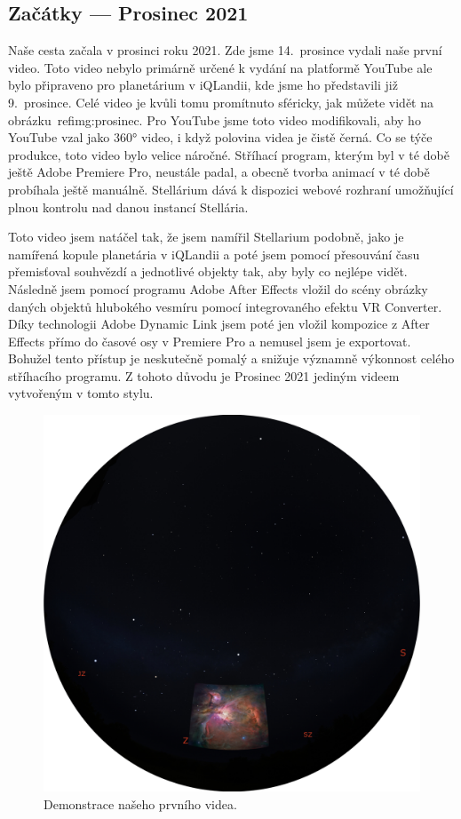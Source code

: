\documentclass[12pt,a4paper,titlepage]{article}
\begin{document}
\subsection{Začátky --- Prosinec 2021}
Naše cesta začala v prosinci roku 2021. Zde jsme 14.\ prosince vydali naše první video. Toto video nebylo primárně určené k vydání na platformě YouTube ale bylo připraveno pro planetárium v iQLandii, kde jsme ho představili již 9.\ prosince. Celé video je kvůli tomu promítnuto sféricky, jak můžete vidět na obrázku~ref{img:prosinec}. Pro YouTube jsme toto video modifikovali, aby ho YouTube vzal jako 360° video, i když polovina videa je čistě černá. Co se týče produkce, toto video bylo velice náročné. Stříhací program, kterým byl v té době ještě Adobe Premiere Pro, neustále padal, a obecně tvorba animací v té době probíhala ještě manuálně. Stellárium dává k dispozici webové rozhraní umožňující plnou kontrolu nad danou instancí Stellária. 

Toto video jsem natáčel tak, že jsem namířil Stellarium podobně, jako je namířená kopule planetária v iQLandii a poté jsem pomocí přesouvání času přemisťoval souhvězdí a jednotlivé objekty tak, aby byly co nejlépe vidět. Následně jsem pomocí programu Adobe After Effects vložil do scény obrázky daných objektů hlubokého vesmíru pomocí integrovaného efektu VR Converter. Díky technologii Adobe Dynamic Link jsem poté jen vložil kompozice z After Effects přímo do časové osy v Premiere Pro a nemusel jsem je exportovat. Bohužel tento přístup je neskutečně pomalý a snižuje významně výkonnost celého stříhacího programu. Z tohoto důvodu je Prosinec 2021 jediným videem vytvořeným v tomto stylu.

\begin{figure}[ht]
	\centering
	\includegraphics[width=.7\textwidth]{prosinec.eps}
	\caption{Demonstrace našeho prvního videa.}\label{img:prosinec}
\end{figure}
\end{document}
